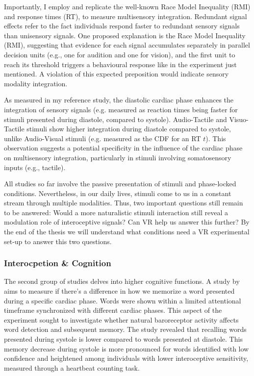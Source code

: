 \documentclass[12pt,oneside,openright]{report}
\begin{document}
Importantly, I employ and replicate the well-known Race Model Inequality (RMI) and response times (RT), to measure multisensory integration. Redundant signal effects refer to the fact individuals respond faster to redundant sensory signals than unisensory signals. One proposed explanation is the Race Model Inequality (RMI), suggesting that evidence for each signal accumulates separately in parallel decision units (e.g., one for audition and one for vision), and the first unit to reach its threshold triggers a behavioural response like in the experiment just mentioned. A violation of this expected preposition would indicate sensory modality integration. 

As measured in my reference study, the diastolic cardiac phase enhances the integration of sensory signals (e.g. measured as reaction times being faster for stimuli presented during diastole, compared
to systole). Audio-Tactile and Visuo-Tactile stimuli show higher integration during diastole compared to systole, unlike Audio-Visual stimuli (e.g. measured as the CDF for an RT $t$). This observation suggests a potential specificity in the influence of the cardiac phase on multisensory integration, particularly in stimuli involving somatosensory inputs (e.g., tactile).

All studies so far involve the passive presentation of stimuli and phase-locked conditions. Nevertheless, in our daily lives, stimuli come to us in a constant stream through multiple modalities. Thus, two important questions still remain to be answered: Would a more naturalistic stimuli interaction still reveal a modulation role of interoceptive signals? Can VR help us answer this further? By the end of the thesis we will understand what conditions need a VR experimental set-up to answer this two questions. 


\subsubsection*{Interocpetion \& Cognition}

The second group of studies delves into higher cognitive functions. A study by \textcite{Garfinkel2013-cy} aims to measure if there's a difference in how we memorize a word presented during a specific cardiac phase. Words were shown within a limited attentional timeframe synchronized with different cardiac phases. This aspect of the experiment sought to investigate whether natural baroreceptor activity affects word detection and subsequent memory. The study revealed that recalling words presented during systole is lower compared to words presented at diastole. This memory decrease during systole is more pronounced for words identified with low confidence and heightened among individuals with lower interoceptive sensitivity, measured through a heartbeat counting task.
\end{document}
